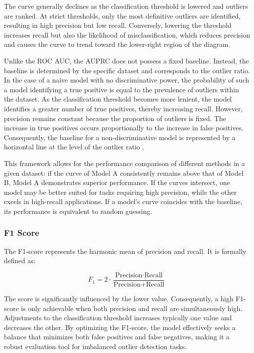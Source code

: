 The curve generally declines as the classification threshold is lowered and outliers are ranked. 
At strict thresholds, only the most definitive outliers are identified, resulting in high precision but low recall. 
Conversely, lowering the threshold increases recall but also the likelihood of misclassification, which reduces precision and causes the curve to trend toward the lower-right region of the diagram.


Unlike the ROC AUC, the AUPRC does not possess a fixed baseline.
Instead, the baseline is determined by the specific dataset and corresponds to the outlier ratio. 
In the case of a naive model with no discriminative power, the probability of such a model identifying a true positive is equal to the prevalence of outliers within the dataset. 
As the classification threshold becomes more lenient, the model identifies a greater number of true positives, thereby increasing recall. 
However, precision remains constant because the proportion of outliers is fixed.
The increase in true positives occurs proportionally to the increase in false positives. 
Consequently, the baseline for a non-discriminative model is represented by a horizontal line at the level of the outlier ratio \citep[p. 3]{flach2015precision}. 


This framework allows for the performance comparison of different methods in a given dataset: if the curve of Model A consistently remains above that of Model B, Model A demonstrates superior performance. 
If the curves intersect, one model may be better suited for tasks requiring high precision, while the other excels in high-recall applications. 
If a model's curve coincides with the baseline, its performance is equivalent to random guessing. 


\subsubsection*{F1 Score}
The F1-score \citep[p. 174]{tharwat2021classification} represents the harmonic mean of precision and recall. 
It is formally defined as:

\begin{equation}
    F_1 = 2 \cdot \frac{\text{Precision} \cdot \text{Recall}}{\text{Precision} + \text{Recall}}
\end{equation}

The score is significantly influenced by the lower value.
Consequently, a high F1-score is only achievable when both precision and recall are simultaneously high. 
Adjustments to the classification threshold increases typically one value and decreases the other. 
By optimizing the F1-score, the model effectively seeks a balance that minimizes both false positives and false negatives, making it a robust evaluation tool for imbalanced outlier detection tasks. 



